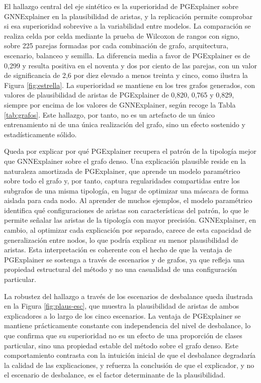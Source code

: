 

El hallazgo central del eje sintético es la superioridad de PGExplainer sobre GNNExplainer en la plausibilidad de aristas, y la replicación permite comprobar si esa superioridad sobrevive a la variabilidad entre modelos. La comparación se realiza celda por celda mediante la prueba de Wilcoxon de rangos con signo, sobre 225 parejas formadas por cada combinación de grafo, arquitectura, escenario, balanceo y semilla. La diferencia media a favor de PGExplainer es de 0,299 y resulta positiva en el noventa y dos por ciento de las parejas, con un valor de significancia de 2,6 por diez elevado a menos treinta y cinco, como ilustra la Figura \ref{fig:estrella}. La superioridad se mantiene en los tres grafos generados, con valores de plausibilidad de aristas de PGExplainer de 0,820, 0,765 y 0,829, siempre por encima de los valores de GNNExplainer, según recoge la Tabla \ref{tab:grafos}. Este hallazgo, por tanto, no es un artefacto de un único entrenamiento ni de una única realización del grafo, sino un efecto sostenido y estadísticamente sólido.

Queda por explicar por qué PGExplainer recupera el patrón de la tipología mejor que GNNExplainer sobre el grafo denso. Una explicación plausible reside en la naturaleza amortizada de PGExplainer, que aprende un modelo paramétrico sobre todo el grafo y, por tanto, captura regularidades compartidas entre los subgrafos de una misma tipología, en lugar de optimizar una máscara de forma aislada para cada nodo. Al aprender de muchos ejemplos, el modelo paramétrico identifica qué configuraciones de aristas son características del patrón, lo que le permite señalar las aristas de la tipología con mayor precisión. GNNExplainer, en cambio, al optimizar cada explicación por separado, carece de esta capacidad de generalización entre nodos, lo que podría explicar su menor plausibilidad de aristas. Esta interpretación es coherente con el hecho de que la ventaja de PGExplainer se sostenga a través de escenarios y de grafos, ya que refleja una propiedad estructural del método y no una casualidad de una configuración particular.

La robustez del hallazgo a través de los escenarios de desbalance queda ilustrada en la Figura \ref{fig:plaus-esc}, que muestra la plausibilidad de aristas de ambos explicadores a lo largo de los cinco escenarios. La ventaja de PGExplainer se mantiene prácticamente constante con independencia del nivel de desbalance, lo que confirma que su superioridad no es un efecto de una proporción de clases particular, sino una propiedad estable del método sobre el grafo denso. Este comportamiento contrasta con la intuición inicial de que el desbalance degradaría la calidad de las explicaciones, y refuerza la conclusión de que el explicador, y no el escenario de desbalance, es el factor determinante de la plausibilidad.

